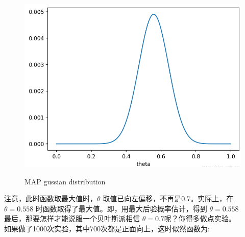 \documentclass[12pt]{ctexart}%
\begin{document}
				\begin{figure}[H]
					\vspace{-0.5cm}  %
					\setlength{\abovecaptionskip}{-0.2cm}   %
					\centering
					\includegraphics[scale=0.4]{MAP_gussian_distribution.png}
					\renewcommand{\figurename}{Fig} %
					\caption{MAP gussian distribution}
					\label{fig:5}
				\end{figure}
			注意，此时函数取最大值时，$\theta$ 取值已向左偏移，不再是0.7。实际上，在 $\theta=0.558$ 时函数取得了最大值。即，用最大后验概率估计，得到 $\theta=0.558$
			\\
			最后，那要怎样才能说服一个贝叶斯派相信 $\theta=0.7$呢？你得多做点实验。
			\\
			如果做了1000次实验，其中700次都是正面向上，这时似然函数为:
\end{document}

